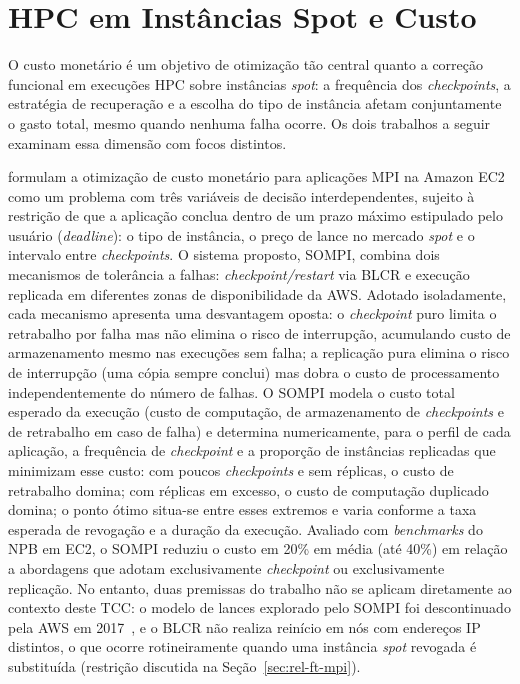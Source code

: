 \section{HPC em Instâncias Spot e Custo}
\label{sec:rel-spot-hpc}

O custo monetário é um objetivo de otimização tão central quanto a correção
funcional em execuções HPC sobre instâncias \textit{spot}: a frequência dos
\textit{checkpoints}, a estratégia de recuperação e a escolha do tipo de
instância afetam conjuntamente o gasto total, mesmo quando nenhuma falha
ocorre. Os dois trabalhos a seguir examinam essa dimensão com focos distintos.

 formulam a otimização de custo monetário para
aplicações MPI na Amazon EC2 como um problema com três variáveis de decisão
interdependentes, sujeito à restrição de que a aplicação conclua dentro de um
prazo máximo estipulado pelo usuário (\textit{deadline}): o tipo de instância,
o preço de lance no mercado \textit{spot} e o intervalo entre
\textit{checkpoints}. O sistema proposto, SOMPI, combina dois mecanismos de
tolerância a falhas: \textit{checkpoint/restart} via BLCR e execução replicada
em diferentes zonas de disponibilidade da AWS. Adotado isoladamente, cada
mecanismo apresenta uma desvantagem oposta: o \textit{checkpoint} puro limita
o retrabalho por falha mas não elimina o risco de interrupção, acumulando
custo de armazenamento mesmo nas execuções sem falha; a replicação pura
elimina o risco de interrupção (uma cópia sempre conclui) mas dobra o custo
de processamento independentemente do número de falhas. O SOMPI modela o
custo total esperado da execução (custo de computação, de armazenamento de
\textit{checkpoints} e de retrabalho em caso de falha) e determina
numericamente, para o perfil de cada aplicação, a frequência de
\textit{checkpoint} e a proporção de instâncias replicadas que minimizam esse
custo: com poucos \textit{checkpoints} e sem réplicas, o custo de retrabalho
domina; com réplicas em excesso, o custo de computação duplicado domina; o
ponto ótimo situa-se entre esses extremos e varia conforme a taxa esperada de
revogação e a duração da execução. Avaliado com \textit{benchmarks} do NPB em EC2, o
SOMPI reduziu o custo em 20\% em média (até 40\%) em relação a abordagens que
adotam exclusivamente \textit{checkpoint} ou exclusivamente replicação. No
entanto, duas premissas do trabalho não se aplicam diretamente ao contexto
deste TCC: o modelo de lances explorado pelo SOMPI foi descontinuado pela AWS
em 2017~\cite{aws2018spot}, e o BLCR não realiza reinício em nós com
endereços IP distintos, o que ocorre rotineiramente quando uma instância
\textit{spot} revogada é substituída (restrição discutida na
Seção~\ref{sec:rel-ft-mpi}).

